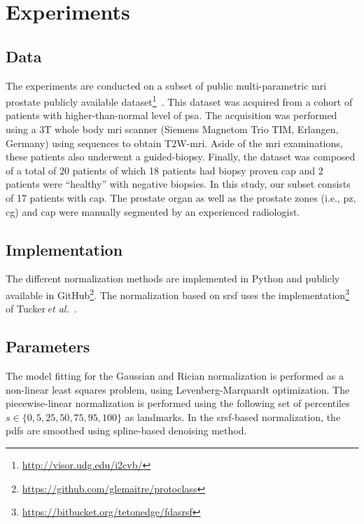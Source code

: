 \section{Experiments}
\label{sec:exp}

\subsection{Data}

The experiments are conducted on a subset of public multi-parametric \ac{mri} prostate publicly available dataset\footnote{\url{http://visor.udg.edu/i2cvb/}}~\cite{lemaitre2015boosting}.
This dataset was acquired from a cohort of patients with higher-than-normal level of \ac{psa}. 
The acquisition was performed using a 3T whole body \ac{mri} scanner (Siemens Magnetom Trio TIM, Erlangen, Germany) using sequences to obtain T2W-\ac{mri}. 
Aside of the \ac{mri} examinations, these patients also underwent a guided-biopsy. 
Finally, the dataset was composed of a total of 20 patients of which 18 patients had biopsy proven \ac{cap} and 2 patients were ``healthy'' with negative biopsies. 
In this study, our subset consists of 17 patients with \ac{cap}. 
The prostate organ as well as the prostate zones (i.e., \ac{pz}, \ac{cg}) and \ac{cap} were manually segmented by an experienced radiologist.

\subsection{Implementation}

The different normalization methods are implemented in Python and publicly available in GitHub\footnote{\url{https://github.com/glemaitre/protoclass}}.
The normalization based on \ac{srsf} uses the implementation\footnote{\url{https://bitbucket.org/tetonedge/fdasrsf}} of Tucker\,\textit{et al.}~\cite{Tucker2013}.

\subsection{Parameters}

The model fitting for the Gaussian and Rician normalization is performed as a non-linear least squares problem, using Levenberg-Marquardt optimization.
The piecewise-linear normalization is performed using the following set of percentiles $s \in \{0, 5, 25, 50, 75, 95, 100 \}$ as landmarks.
In the \ac{srsf}-based normalization, the \acp{pdf} are smoothed using spline-based denoising method.
